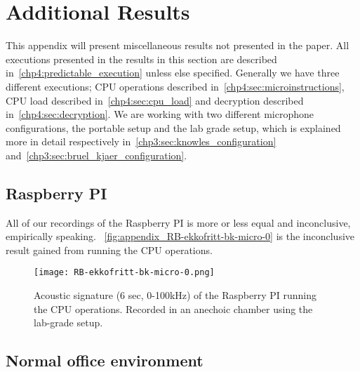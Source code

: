 \chapter{Additional Results}\label{apx:results}
This appendix will present miscellaneous results not presented in the paper.
All executions presented in the results in this section are described in~\autoref{chp4:predictable_execution} unless else specified. 
Generally we have three different executions; CPU operations described in~\autoref{chp4:sec:microinstructions}, CPU load described in~\autoref{chp4:sec:cpu_load} and decryption described in~\autoref{chp4:sec:decryption}. 
We are working with two different microphone configurations, the portable setup and the lab grade setup, which is explained more in detail respectively in~\autoref{chp3:sec:knowles_configuration} and~\autoref{chp3:sec:bruel_kjaer_configuration}.


\section{Raspberry PI}\label{apx:sec:raspberry}
All of our recordings of the Raspberry PI is more or less equal and inconclusive, empirically speaking. 
~\autoref{fig:appendix_RB-ekkofritt-bk-micro-0} is the inconclusive result gained from running the CPU operations. 
\begin{figure}[ht]
    \centering
    \texttt{[image: RB-ekkofritt-bk-micro-0.png]}
    \caption{Acoustic signature (6 sec, 0-100kHz) of the Raspberry PI running the CPU operations.
        Recorded in an anechoic chamber using the lab-grade setup.}
    \label{fig:appendix_RB-ekkofritt-bk-micro-0}
\end{figure}


\section{Normal office environment}


